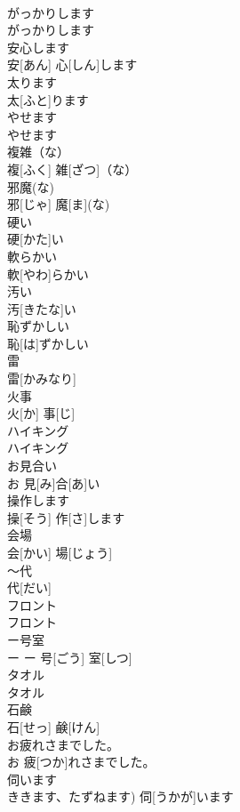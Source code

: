 \documentclass[8pt]{extreport}
\begin{document}
\begin{CJK}{UTF8}{min}
\\	がっかりします	
\\	がっかりします		
\\	安心します	
\\	安[あん] 心[しん]します		
\\	太ります	
\\	太[ふと]ります		
\\	やせます	
\\	やせます		
\\	複雑（な）	
\\	複[ふく] 雑[ざつ]（な）		
\\	邪魔(な)	
\\	邪[じゃ] 魔[ま](な)		
\\	硬い	
\\	硬[かた]い		
\\	軟らかい	
\\	軟[やわ]らかい		
\\	汚い	
\\	汚[きたな]い		
\\	恥ずかしい	
\\	恥[は]ずかしい		
\\	雷	
\\	雷[かみなり]		
\\	火事	
\\	火[か] 事[じ]		
\\	ハイキング	
\\	ハイキング		
\\	お見合い	
\\	お 見[み]合[あ]い		
\\	操作します	
\\	操[そう] 作[さ]します		
\\	会場	
\\	会[かい] 場[じょう]		
\\	～代	
\\	代[だい]		
\\	フロント	
\\	フロント		
\\	ー号室	
\\	ー	ー 号[ごう] 室[しつ]		
\\	タオル	
\\	タオル		
\\	石鹸	
\\	石[せっ] 鹸[けん]		
\\	お疲れさまでした。	
\\	お 疲[つか]れさまでした。		
\\	伺います	
\\	ききます、たずねます)	伺[うかが]います		

\end{CJK}
\end{document}
